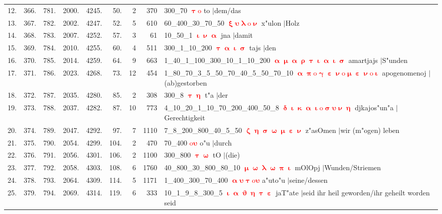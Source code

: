 \documentclass[a4paper,10pt,landscape]{article}
\begin{document}
\begin{tabular}{rrrrrrrrp{120mm}}
12.&366.&781.&2000.&4245.&50.&2&370&300\_70 \textcolor{red}{$\boldsymbol{\uptau\mathrm{o}}$} to $|$dem/das\\
13.&367.&782.&2002.&4247.&52.&5&610&60\_400\_30\_70\_50 \textcolor{red}{$\boldsymbol{\upxi\upsilon\uplambda\mathrm{o}\upnu}$} x"ulon $|$Holz\\
14.&368.&783.&2007.&4252.&57.&3&61&10\_50\_1 \textcolor{red}{$\boldsymbol{\upiota\upnu\upalpha}$} jna $|$damit\\
15.&369.&784.&2010.&4255.&60.&4&511&300\_1\_10\_200 \textcolor{red}{$\boldsymbol{\uptau\upalpha\upiota\upsigma}$} tajs $|$den\\
16.&370.&785.&2014.&4259.&64.&9&663&1\_40\_1\_100\_300\_10\_1\_10\_200 \textcolor{red}{$\boldsymbol{\upalpha\upmu\upalpha\uprho\uptau\upiota\upalpha\upiota\upsigma}$} amartjajs $|$S"unden\\
17.&371.&786.&2023.&4268.&73.&12&454&1\_80\_70\_3\_5\_50\_70\_40\_5\_50\_70\_10 \textcolor{red}{$\boldsymbol{\upalpha\uppi\mathrm{o}\upgamma\upepsilon\upnu\mathrm{o}\upmu\upepsilon\upnu\mathrm{o}\upiota}$} apogenomenoj $|$(ab)gestorben\\
18.&372.&787.&2035.&4280.&85.&2&308&300\_8 \textcolor{red}{$\boldsymbol{\uptau\upeta}$} t"a $|$der\\
19.&373.&788.&2037.&4282.&87.&10&773&4\_10\_20\_1\_10\_70\_200\_400\_50\_8 \textcolor{red}{$\boldsymbol{\updelta\upiota\upkappa\upalpha\upiota\mathrm{o}\upsigma\upsilon\upnu\upeta}$} djkajos"un"a $|$Gerechtigkeit\\
20.&374.&789.&2047.&4292.&97.&7&1110&7\_8\_200\_800\_40\_5\_50 \textcolor{red}{$\boldsymbol{\upzeta\upeta\upsigma\upomega\upmu\upepsilon\upnu}$} z"asOmen $|$wir (m"ogen) leben\\
21.&375.&790.&2054.&4299.&104.&2&470&70\_400 \textcolor{red}{$\boldsymbol{\mathrm{o}\upsilon}$} o"u $|$durch\\
22.&376.&791.&2056.&4301.&106.&2&1100&300\_800 \textcolor{red}{$\boldsymbol{\uptau\upomega}$} tO $|$(die)\\
23.&377.&792.&2058.&4303.&108.&6&1760&40\_800\_30\_800\_80\_10 \textcolor{red}{$\boldsymbol{\upmu\upomega\uplambda\upomega\uppi\upiota}$} mOlOpj $|$Wunden/Striemen\\
24.&378.&793.&2064.&4309.&114.&5&1171&1\_400\_300\_70\_400 \textcolor{red}{$\boldsymbol{\upalpha\upsilon\uptau\mathrm{o}\upsilon}$} a"uto"u $|$seine/dessen\\
25.&379.&794.&2069.&4314.&119.&6&333&10\_1\_9\_8\_300\_5 \textcolor{red}{$\boldsymbol{\upiota\upalpha\upvartheta\upeta\uptau\upepsilon}$} jaT"ate $|$seid ihr heil geworden/ihr geheilt worden seid\\
\end{tabular}\medskip \\
\end{document}
